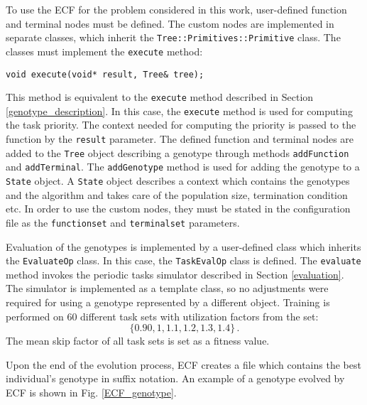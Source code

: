 To use the ECF for the problem considered in this work, user-defined function and terminal nodes must be defined.
The custom nodes are implemented in separate classes, which inherit the \texttt{Tree::Primitives::Primitive} class.
The classes must implement the \texttt{execute} method:
\begin{lstlisting}[frame=none, label={exec}, caption={A prototype of the \texttt{execute} method.}, captionpos=b]
    void execute(void* result, Tree& tree);
\end{lstlisting}
This method is equivalent to the \texttt{execute} method described in Section \ref{genotype_description}.
In this case, the \texttt{execute} method is used for computing the task priority.
The context needed for computing the priority is passed to the function by the \texttt{result} parameter.
The defined function and terminal nodes are added to the \texttt{Tree} object  describing a genotype through methods \texttt{addFunction} and \texttt{addTerminal}.
The \texttt{addGenotype} method is used for adding the genotype to a \texttt{State} object.
A \texttt{State} object describes a context which contains the genotypes and the algorithm and takes care of the population size, termination condition etc.
In order to use the custom nodes, they must be stated in the configuration file as the \texttt{functionset} and \texttt{terminalset} parameters.

Evaluation of the genotypes is implemented by a user-defined class which inherits the \texttt{EvaluateOp} class.
In this case, the \texttt{TaskEvalOp} class is defined.
The \texttt{evaluate} method invokes the periodic tasks simulator described in Section
\ref{evaluation}.
The simulator is implemented as a template class, so no adjustments were required for using a genotype represented by a different object.
Training is performed on 60 different task sets with utilization factors from the set:
\begin{equation*}
\{ 0.90, 1, 1.1, 1.2, 1.3, 1.4 \} \, .
\end{equation*}
The mean skip factor of all task sets is set as a fitness value.

Upon the end of the evolution process, ECF creates a file which contains the best individual's genotype in suffix notation.
An example of a genotype evolved by ECF is shown in Fig. \ref{ECF_genotype}.


